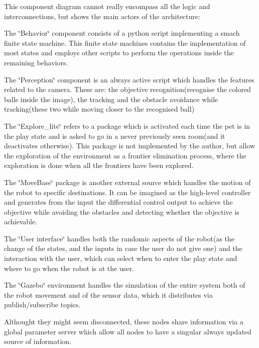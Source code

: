 This component diagram cannot really encompass all the logic and interconnections, but shows the main actors of the architecture\+:
\begin{DoxyItemize}
\item The \char`\"{}\+Behavior\char`\"{} component consists of a python script implementing a smach finite state machine. This finite state machines contains the implementation of most states and employs other scripts to perform the operations inside the remaining behaviors.
\item The \char`\"{}\+Perception\char`\"{} component is an always active script which handles the features related to the camera. These are\+: the objective recognition(recognise the colored balls inside the image), the tracking and the obstacle avoidance while tracking(these two while moving closer to the recognised ball)
\item The \char`\"{}\+Explore\+\_\+lite\char`\"{} refers to a package which is activated each time the pet is in the play state and is asked to go in a never previously seen room(and it deactivates otherwise). This package is not implemented by the author, but allow the exploration of the environment as a frontier elimination process, where the exploration is done when all the frontiers have been explored.
\item The \char`\"{}\+Move\+Base\char`\"{} package is another external source which handles the motion of the robot to specific destinations. It can be imagined as the high-\/level controller and generates from the input the differential control output to achieve the objective while avoiding the obstacles and detecting whether the objective is achievable.
\item The \char`\"{}\+User interface\char`\"{} handles both the randomic aspects of the robot(as the change of the states, and the inputs in case the user do not give one) and the interaction with the user, which can select when to enter the play state and where to go when the robot is at the user.
\item The \char`\"{}\+Gazebo\char`\"{} environment handles the simulation of the entire system both of the robot movement and of the sensor data, which it distributes via publish/subscribe topics.
\end{DoxyItemize}

Althought they might seem disconnected, these nodes share information via a global parameter server which allow all nodes to have a singular always updated source of information.

